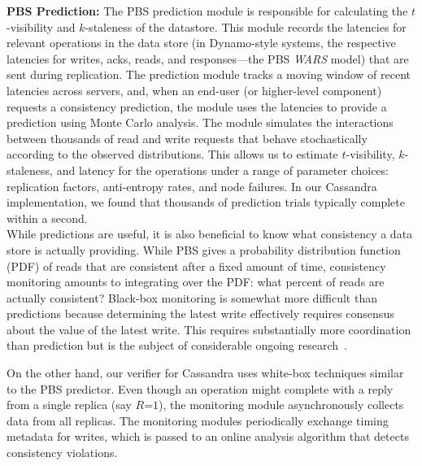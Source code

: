 \noindent\textbf{PBS Prediction:} The PBS prediction module is
responsible for calculating the $t$-visibility and $k$-staleness of
the datastore. This module records the latencies for relevant
operations in the data store (in Dynamo-style systems, the respective
latencies for writes, acks, reads, and responses---the PBS
\textit{WARS} model) that are sent during replication.  The prediction
module tracks a moving window of recent latencies across servers, and,
when an end-user (or higher-level component) requests a consistency
prediction, the module uses the latencies to provide a prediction
using Monte Carlo analysis. The module simulates the interactions
between thousands of read and write requests that behave
stochastically according to the observed distributions. This allows us
to estimate $t$-visibility, $k$-staleness, and latency for the
operations under a range of parameter choices: replication factors,
anti-entropy rates, and node failures. In our Cassandra
implementation, we found that thousands of prediction trials typically
complete within a second.\\

 While predictions are useful, it is
also beneficial to know what consistency a data store is actually providing.
While PBS gives a probability distribution function (PDF) of reads that are
consistent after a fixed amount of time, consistency monitoring amounts to
integrating over the PDF: what percent of reads are actually consistent?
Black-box monitoring is somewhat more difficult than predictions because
determining the latest write effectively requires consensus about the value of
the latest write. This requires substantially more coordination than prediction
but is the subject of considerable ongoing research~\cite{hotdep}. 

On the other hand, our verifier for Cassandra uses white-box
techniques similar to the PBS predictor. Even though an operation
might complete with a reply from a single replica (say $R$=$1$), the
monitoring module asynchronously collects data from all replicas. The
monitoring modules periodically exchange timing metadata for writes,
which is passed to an online analysis algorithm that detects
consistency violations.

